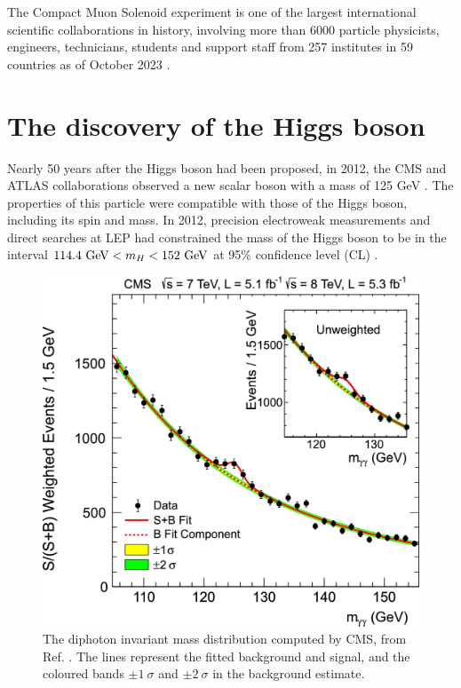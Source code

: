 The Compact Muon Solenoid experiment is one of the largest international scientific collaborations in history, involving more than 6000 particle physicists, engineers, technicians, students and support staff from 257 institutes in 59 countries as of October 2023 \cite{CERN:CMS_people}.

\section{The discovery of the Higgs boson}\label{sec:Higgs_discovery}

Nearly 50 years after the Higgs boson had been proposed, in 2012, the CMS and ATLAS collaborations observed a new scalar boson with a mass of 125 GeV \cite{CMS:2012qbp, ATLAS:2012yve}. The properties of this particle were compatible with those of the Higgs boson, including its spin and mass. In 2012, precision electroweak measurements and direct searches at LEP had constrained the mass of the Higgs boson to be in the interval $114.4\ \GeV < m_H < 152\ \GeV$ at 95\% confidence level (CL) \cite{ALEPH:2010aa, LEPWorkingGroupforHiggsbosonsearches:2003ing}.

\begin{figure}[!ht]
    \vspace*{-0.0cm}
    \centering
    \setlength{\mylength}{\textwidth}
    \includegraphics[width=0.60\mylength]{resources/CMS_Higgs_diphoton.jpg}
    \vspace*{-0.0cm}
    \caption{The diphoton invariant mass distribution computed by CMS, from Ref. \cite{CMS:2012qbp}. The lines represent the fitted background and signal, and the coloured bands $\pm1\ \sigma$ and $\pm2\ \sigma$ in the background estimate.}
    \label{fig:CMS_Higgs_diphoton}
    \vspace*{-0.3cm}
\end{figure}

